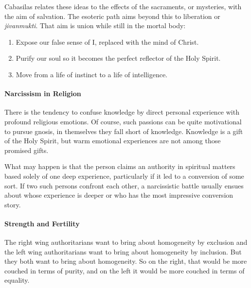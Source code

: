Cabasilas relates these ideas to the effects of the sacraments, or mysteries, with the aim of salvation. The esoteric path aims beyond this to liberation or \emph{jivanmukti}. That aim is union while still in the mortal body:

\begin{enumerate}


\item Expose our false sense of I, replaced with the mind of Christ.

\item Purify our soul so it becomes the perfect reflector of the Holy Spirit.

\item Move from a life of instinct to a life of intelligence.
\end{enumerate}


\paragraph{Narcissism in Religion}


There is the tendency to confuse knowledge by direct personal experience with profound religious emotions. Of course, such passions can be quite motivational to pursue gnosis, in themselves they fall short of knowledge. Knowledge is a gift of the Holy Spirit, but warm emotional experiences are not among those promised gifts.

What may happen is that the person claims an authority in spiritual matters based solely of one deep experience, particularly if it led to a conversion of some sort. If two such persons confront each other, a narcissistic battle usually ensues about whose experience is deeper or who has the most impressive conversion story.

\paragraph{Strength and Fertility}


\begin{quotex}
The right wing authoritarians want to bring about homogeneity by exclusion and the left wing authoritarians want to bring about homogeneity by inclusion. But they both want to bring about homogeneity. So on the right, that would be more couched in terms of purity, and on the left it would be more couched in terms of equality. 
\end{quotex}


